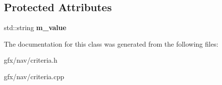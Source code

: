\subsection*{Protected Attributes}
\begin{DoxyCompactItemize}
\item 
std\+::string {\bfseries m\+\_\+value}\hypertarget{classCriteriaLeaf_a3dbe390ede46ae40b91f1674c4929eae}{}\label{classCriteriaLeaf_a3dbe390ede46ae40b91f1674c4929eae}

\end{DoxyCompactItemize}


The documentation for this class was generated from the following files\+:\begin{DoxyCompactItemize}
\item 
gfx/nav/criteria.\+h\item 
gfx/nav/criteria.\+cpp\end{DoxyCompactItemize}
